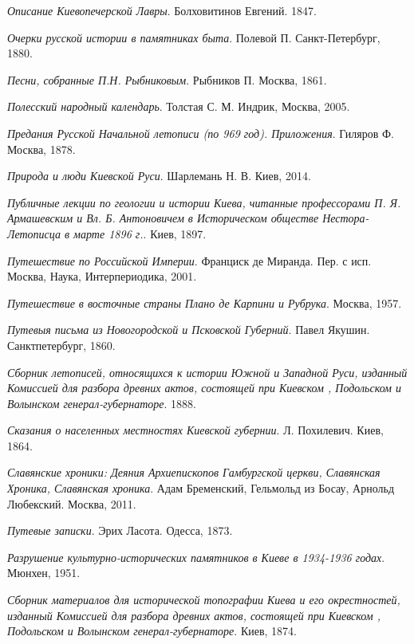 \emph{Описание Киевопечерской Лавры}. Болховитинов Евгений. 1847.

\emph{Очерки русской истории в памятниках быта}. Полевой П. Санкт-Петербург, 1880.

\emph{Песни, собранные П.Н. Рыбниковым}. Рыбников П. Москва, 1861.

\emph{Полесский народный календарь}. Толстая С. М. Индрик, Москва, 2005.

\emph{Предания Русской Начальной летописи (по 969 год). Приложения}. Гиляров Ф. Москва, 1878.

\emph{Природа и люди Киевской Руси}. Шарлемань Н. В. Киев, 2014.

\emph{Публичные лекции по геологии и истории Киева, читанные профессорами П. Я. Армашевским и Вл. Б. Антоновичем в Историческом обществе Нестора-Летописца в марте 1896 г.}. Киев, 1897.

\emph{Путешествие по Российской Империи}. Франциск де Миранда. Пер. с исп. Москва, Наука, Интерпериодика, 2001.

\emph{Путешествие в восточные страны Плано де Карпини и Рубрука}. Москва, 1957.

\emph{Путевыя письма из Новогородской и Псковской Губерний}. Павел Якушин. Санктпетербург, 1860.

\emph{Сборник летописей, относящихся к истории Южной и Западной Руси, изданный Комиссией для разбора древних актов, состоящей при Киевском , Подольском и Волынском генерал-губернаторе}. 1888.

\emph{Сказания о населенных местностях Киевской губернии}. Л. Похилевич. Киев, 1864.

\emph{Славянские хроники: Деяния Архиепископов Гамбургской церкви, Славянская Хроника, Славянская хроника}. Адам Бременский, Гельмольд из Босау, Арнольд Любекский. Москва, 2011. 

\emph{Путевые записки}. Эрих Ласота. Одесса, 1873.

\emph{Разрушение культурно-исторических памятников в Киеве в 1934-1936 годах}. Мюнхен, 1951.

\emph{Сборник материалов для исторической топографии Киева и его окрестностей, изданный Комиссией для разбора древних актов, состоящей при Киевском , Подольском и Волынском генерал-губернаторе}. Киев, 1874.

